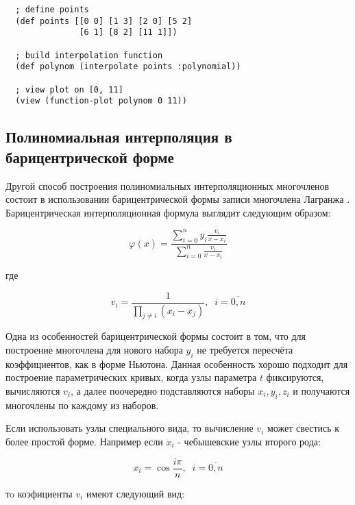 \begin{verbatim}
  ; define points
  (def points [[0 0] [1 3] [2 0] [5 2] 
               [6 1] [8 2] [11 1]])

  ; build interpolation function
  (def polynom (interpolate points :polynomial))

  ; view plot on [0, 11]
  (view (function-plot polynom 0 11))
\end{verbatim}




\subsection{Полиномиальная интерполяция в барицентрической форме}

Другой способ построения полиномиальных интерполяционных многочленов состоит в использовании барицентрической формы записи многочлена Лагранжа \cite{berrut2004}. Барицентрическая интерполяционная формула выглядит следующим образом:

\begin{equation}
  \varphi(x) = \frac
  {\sum\limits_{i=0}^n y_i \frac{v_i}{x - x_i}}
  {\sum\limits_{i=0}^n \frac{v_i}{x - x_i}}
\end{equation}

\noindent где

\begin{equation}
  v_i = \frac{1}{\prod_{j \neq i}(x_i - x_j)}, \;\; i = \overline{0,n}
\end{equation}

Одна из особенностей барицентрической формы состоит в том, что для построение многочлена для нового набора ${y_i}$ не требуется пересчёта коэффициентов, как в форме Ньютона. Данная особенность хорошо подходит для построение параметрических кривых, когда узлы параметра $t$ фиксируются, вычисляются $v_i$, а далее поочередно подставляются наборы ${x_i}, {y_i}, {z_i}$ и получаются многочлены по каждому из наборов.

Если использовать узлы специального вида, то вычисление $v_i$ может свестись к более простой форме. Например если $x_i$ - чебышевские узлы второго рода:

\begin{equation}
  x_i = \cos \frac{i \pi}{n}, \;\; i = \overline{0, n}
\end{equation}

\noindent тo коэфициенты $v_i$ имеют следующий вид:

